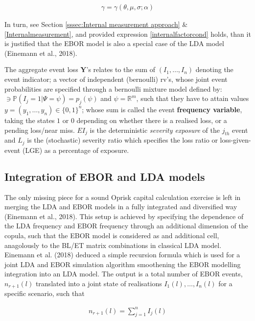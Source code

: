 \documentclass{DissertateUSU}
\begin{document}
\singlespacing

\begin{eqnarray}\label{internalfactorcond}
\gamma = \gamma(\theta, \mu, \sigma;\alpha)
\end{eqnarray} \doublespacing

In turn, see Section \ref{sssec:Internal measurement approach} \&
\ref{Internalmeasurement}, and provided expression
\ref{internalfactorcond} holds, than it is justified that the EBOR model
is also a special case of the LDA model (Einemann et al., 2018).\medskip

The aggregate event loss \(\mathbf{Y}\)'s relates to the sum of
\((I_1,\ldots,I_n)\) denoting the event indicator; a vector of
independent (bernoulli) rv's, whose joint event probabilities are
specified through a bernoulli mixture model defined by:
\(\ni \mathbb{P}(I_j=1|\Psi=\psi)=p_j(\psi)\) and \(\psi=\mathbb{R}^m\),
such that they have to attain values
\(y=(y_1,\ldots,y_n) \in \{0,1\}^n\); whose sum is called the event
\textbf{frequency variable}, taking the states \(1\) or \(0\) depending
on whether there is a realised loss, or a pending loss/near miss.
\(EI_j\) is the deterministic \emph{severity exposure} of the \(j_{th}\)
event and \(L_j\) is the (stochastic) severity ratio which specifies the
loss ratio or loss-given-event (LGE) as a percentage of exposure.

\subsection{Integration of EBOR and LDA models}

The only missing piece for a sound Oprisk capital calculation exercise
is left in merging the LDA and EBOR models in a fully integrated and
diversified way (Einemann et al., 2018). This setup is achieved by
specifying the dependence of the LDA frequency and EBOR frequency
through an additional dimension of the copula, such that the EBOR model
is considered as and additional cell, anagolously to the BL/ET matrix
combinations in classical LDA model. Einemann et al. (2018) deduced a
simple recursion formula which is used for a joint LDA and EBOR
simulation algorithm smoothening the EBOR modelling integration into an
LDA model. The output is a total number of EBOR events, \(n_{r+1}(l)\)
translated into a joint state of realisations \(I_1(l),\ldots,I_n(l)\)
for a specific scenario, such that

\singlespacing

\begin{eqnarray}\label{EBORexposure}
n_{r+1}(l)=\sum_{j=1}^n I_j(l)
\end{eqnarray} \doublespacing
\end{document}
